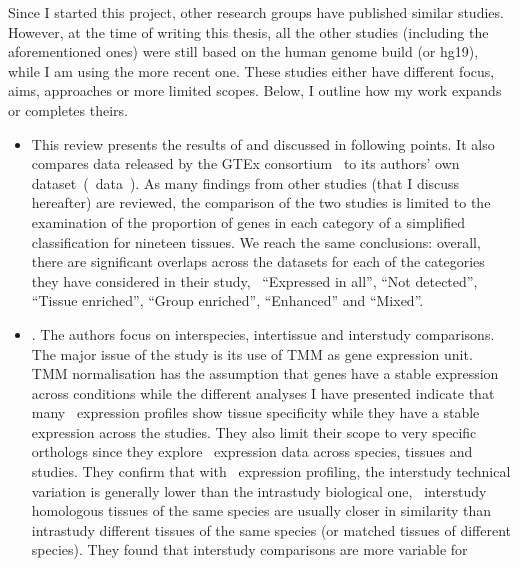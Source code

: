 Since I started this project,
other research groups have published similar studies.
However, at the time of writing this thesis,
all the other studies (including the aforementioned ones)
were still based on the human genome build  (or hg19),
while I am using the more recent  one.
These studies either have different focus, aims,
approaches or more limited scopes.
Below, I outline how my work expands or completes theirs.\mybr\
\begin{itemize}[topsep=0pt,nosep]
\item\hspace{-1mm} This review
presents the results of \citet{Yu2015-uh} and \citet{Danielsson2015-cn}
discussed in following points.
It also compares data released by the \gls{GTEx} consortium~
to its authors' own dataset~(\uhlen\ data~\mycite{Uhlen2014,Uhlen2015}).
As many findings from other studies (that I discuss hereafter) are reviewed,
the comparison of the two studies is
limited to the examination of
the proportion of genes in each category of a simplified classification
for nineteen tissues.
We reach the same conclusions:
overall, there are significant overlaps across the datasets for each of the
categories they have considered in their study, \ie\ \enquote{Expressed in all},
\enquote{Not detected}, \enquote{Tissue enriched}, \enquote{Group enriched},
\enquote{Enhanced} and \enquote{Mixed}.\mybr\
\item\hspace{-1mm}\fullcite{Sudmant2015-zt}.
The authors focus on interspecies, intertissue and interstudy comparisons.
The major issue of the study is its use of \gls{TMM} as gene expression unit.
\gls{TMM} normalisation has the assumption that
genes have a stable expression across conditions while the different analyses
I have presented indicate that many \pcgs\ expression profiles show tissue
specificity while they have a stable expression across the studies.
They also limit their scope to very specific orthologs
since they explore \Rnaseq\ expression data across species, tissues and studies.
They confirm that with \Rnaseq\ expression profiling,
the interstudy technical variation is generally lower than
the intrastudy biological one, \ie\
interstudy homologous tissues of the same species are usually
closer in similarity than intrastudy different tissues of the same species
(or matched tissues of different species).
They found that interstudy comparisons are more variable for 

\end{itemize}
